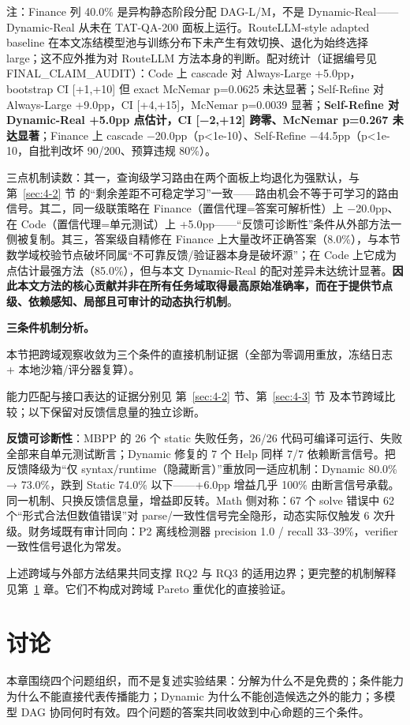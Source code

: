 注：Finance 列 40.0\% 是异构静态阶段分配 DAG-L/M，不是 Dynamic-Real------Dynamic-Real 从未在 TAT-QA-200 面板上运行。RouteLLM-style adapted baseline 在本文冻结模型池与训练分布下未产生有效切换、退化为始终选择 large；这不应外推为对 RouteLLM 方法本身的判断。配对统计（证据编号见 FINAL\_CLAIM\_AUDIT）：Code 上 cascade 对 Always-Large +5.0pp，bootstrap CI {[}+1,+10{]} 但 exact McNemar p=0.0625 未达显著；Self-Refine 对 Always-Large +9.0pp，CI {[}+4,+15{]}，McNemar p=0.0039 显著；\textbf{Self-Refine 对 Dynamic-Real +5.0pp 点估计，CI {[}−2,+12{]} 跨零、McNemar p=0.267 未达显著}；Finance 上 cascade −20.0pp（p\textless1e-10）、Self-Refine −44.5pp（p\textless1e-10，自批判改坏 90/200、预算违规 80\%）。

三点机制读数：其一，查询级学习路由在两个面板上均退化为强默认，与 第~\ref{sec:4-2} 节 的``剩余差距不可稳定学习''一致------路由机会不等于可学习的路由信号。其二，同一级联策略在 Finance（置信代理=答案可解析性）上 −20.0pp、在 Code（置信代理=单元测试）上 +5.0pp------``反馈可诊断性''条件从外部方法一侧被复制。其三，答案级自精修在 Finance 上大量改坏正确答案（8.0\%），与本节数学域校验节点破坏同属``不可靠反馈/验证器本身是破坏源''；在 Code 上它成为点估计最强方法（85.0\%），但与本文 Dynamic-Real 的配对差异未达统计显著。\textbf{因此本文方法的核心贡献并非在所有任务域取得最高原始准确率，而在于提供节点级、依赖感知、局部且可审计的动态执行机制}。

\textbf{三条件机制分析。}

本节把跨域观察收敛为三个条件的直接机制证据（全部为零调用重放，冻结日志 + 本地沙箱/评分器复算）。

能力匹配与接口表达的证据分别见 第~\ref{sec:4-2} 节、第~\ref{sec:4-3} 节 及本节跨域比较；以下保留对反馈信息量的独立诊断。

\textbf{反馈可诊断性}：MBPP 的 26 个 static 失败任务，26/26 代码可编译可运行、失败全部来自单元测试断言；Dynamic 修复的 7 个 Help 同样 7/7 依赖断言信号。把反馈降级为``仅 syntax/runtime（隐藏断言）''重放同一适应机制：Dynamic 80.0\% → 73.0\%，跌到 Static 74.0\% 以下------+6.0pp 增益几乎 100\% 由断言信号承载。同一机制、只换反馈信息量，增益即反转。Math 侧对称：67 个 solve 错误中 62 个``形式合法但数值错误''对 parse/一致性信号完全隐形，动态实际仅触发 6 次升级。财务域既有审计同向：P2 离线检测器 precision 1.0 / recall 33--39\%，verifier 一致性信号退化为常发。

上述跨域与外部方法结果共同支撑 RQ2 与 RQ3 的适用边界；更完整的机制解释见第~\ref{sec:discussion} 章。它们不构成对跨域 Pareto 重优化的直接验证。

\FloatBarrier
\section{讨论}\label{sec:discussion}
本章围绕四个问题组织，而不是复述实验结果：分解为什么不是免费的；条件能力为什么不能直接代表传播能力；Dynamic 为什么不能创造候选之外的能力；多模型 DAG 协同何时有效。四个问题的答案共同收敛到中心命题的三个条件。


